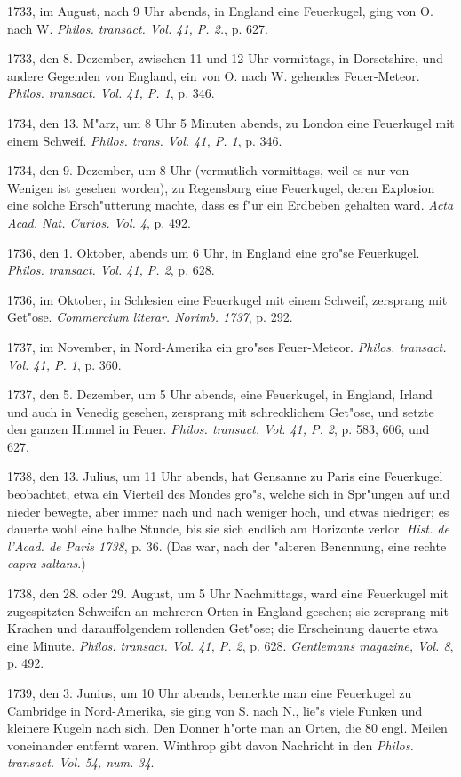 \documentclass[a4paper, 11pt, oneside, polutonikogreek, german]{article}
\begin{document}
1733, im August, nach 9 Uhr abends, in England eine Feuerkugel, ging von O. nach W. \emph{Philos. transact. Vol. 41, P. 2.}, p. 627.

1733, den 8. Dezember, zwischen 11 und 12 Uhr vormittags, in Dorsetshire, und andere Gegenden von England, ein von O. nach W. gehendes Feuer-Meteor. \emph{Philos. transact. Vol. 41, P. 1}, p. 346.

1734, den 13. M"arz, um 8 Uhr 5 Minuten abends, zu London eine Feuerkugel mit einem Schweif. \emph{Philos. trans. Vol. 41, P. 1}, p. 346.

1734, den 9. Dezember, um 8 Uhr (vermutlich vormittags, weil es nur von Wenigen ist gesehen worden), zu Regensburg eine Feuerkugel, deren Explosion eine solche Ersch"utterung machte, dass es f"ur ein Erdbeben gehalten ward. \emph{Acta Acad. Nat. Curios. Vol. 4}, p. 492.

1736, den 1. Oktober, abends um 6 Uhr, in England eine gro"se Feuerkugel. \emph{Philos. transact. Vol. 41, P. 2}, p. 628.

1736, im Oktober, in Schlesien eine Feuerkugel mit einem Schweif, zersprang mit Get"ose. \emph{Commercium literar. Norimb. 1737}, p. 292.

1737, im November, in Nord-Amerika ein gro"ses Feuer-Meteor. \emph{Philos. transact. Vol. 41, P. 1}, p. 360.

1737, den 5. Dezember, um 5 Uhr abends, eine Feuerkugel, in England, Irland und auch in Venedig gesehen, zersprang mit schrecklichem Get"ose, und setzte den ganzen Himmel in Feuer. \emph{Philos. transact. Vol. 41, P. 2}, p. 583, 606, und 627.

1738, den 13. Julius, um 11 Uhr abends, hat Gensanne zu Paris eine Feuerkugel beobachtet, etwa ein Vierteil des Mondes gro"s, welche sich in Spr"ungen auf und nieder bewegte, aber immer nach und nach weniger hoch, und etwas niedriger; es dauerte wohl eine halbe Stunde, bis sie sich endlich am Horizonte verlor. \emph{Hist. de l'Acad. de Paris 1738}, p. 36. (Das war, nach der "alteren Benennung, eine rechte \emph{capra saltans}.)

1738, den 28. oder 29. August, um 5 Uhr Nachmittags, ward eine Feuerkugel mit zugespitzten Schweifen an mehreren Orten in England gesehen; sie zersprang mit Krachen und darauffolgendem rollenden Get"ose; die Erscheinung dauerte etwa eine Minute. \emph{Philos. transact. Vol. 41, P. 2}, p. 628. \emph{Gentlemans magazine, Vol. 8}, p. 492.

1739, den 3. Junius, um 10 Uhr abends, bemerkte man eine Feuerkugel zu Cambridge in Nord-Amerika, sie ging von S. nach N., lie"s viele Funken und kleinere Kugeln nach sich. Den Donner h"orte man an Orten, die 80 engl. Meilen voneinander entfernt waren. Winthrop gibt davon Nachricht in den \emph{Philos. transact. Vol. 54, num. 34}.
\end{document}
